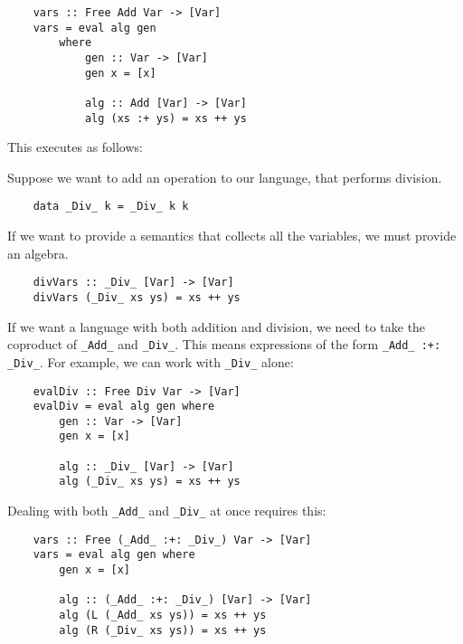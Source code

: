 \documentclass[a4paper,12pt]{article}
\theoremstyle{remark}
\begin{document}
\begin{lstlisting}
    vars :: Free Add Var -> [Var]
    vars = eval alg gen
        where
            gen :: Var -> [Var]
            gen x = [x]

            alg :: Add [Var] -> [Var]
            alg (xs :+ ys) = xs ++ ys  \end{lstlisting}

This executes as follows:

\begin{figure}[H]
  \centering
\end{figure}

Suppose we want to add an operation to our language, that performs division.

\begin{lstlisting}
    data _Div_ k = _Div_ k k  \end{lstlisting}

If we want to provide a semantics that collects all the variables, we must provide
an algebra.

\begin{lstlisting}
    divVars :: _Div_ [Var] -> [Var]
    divVars (_Div_ xs ys) = xs ++ ys  \end{lstlisting}

If we want a language with both addition and division, we need to take the coproduct of
\lstinline{_Add_} and \lstinline{_Div_}. This means expressions of the form \lstinline{_Add_ :+: _Div_}. For example, we can work with \lstinline{_Div_} alone:

\begin{lstlisting}
    evalDiv :: Free Div Var -> [Var]
    evalDiv = eval alg gen where
        gen :: Var -> [Var]
        gen x = [x]

        alg :: _Div_ [Var] -> [Var]
        alg (_Div_ xs ys) = xs ++ ys  \end{lstlisting}

Dealing with both \lstinline{_Add_} and \lstinline{_Div_} at once requires this:

\begin{lstlisting}
    vars :: Free (_Add_ :+: _Div_) Var -> [Var]
    vars = eval alg gen where
        gen x = [x]

        alg :: (_Add_ :+: _Div_) [Var] -> [Var]
        alg (L (_Add_ xs ys)) = xs ++ ys
        alg (R (_Div_ xs ys)) = xs ++ ys  \end{lstlisting}
\end{document}
